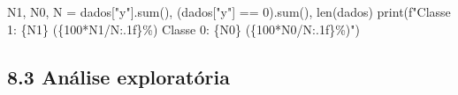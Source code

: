 \documentclass[
  letterpaper,
  DIV=11,
  numbers=noendperiod]{scrartcl}
\newenvironment{Shaded}{\begin{snugshade}}{\end{snugshade}}
\newcommand{\BuiltInTok}[1]{\textcolor[rgb]{0.00,0.23,0.31}{#1}}
\newcommand{\DecValTok}[1]{\textcolor[rgb]{0.68,0.00,0.00}{#1}}
\newcommand{\NormalTok}[1]{\textcolor[rgb]{0.00,0.23,0.31}{#1}}
\newcommand{\OperatorTok}[1]{\textcolor[rgb]{0.37,0.37,0.37}{#1}}
\newcommand{\SpecialCharTok}[1]{\textcolor[rgb]{0.37,0.37,0.37}{#1}}
\newcommand{\SpecialStringTok}[1]{\textcolor[rgb]{0.13,0.47,0.30}{#1}}
\newcommand{\StringTok}[1]{\textcolor[rgb]{0.13,0.47,0.30}{#1}}
\begin{document}
\begin{Shaded}
\begin{Highlighting}[]
\NormalTok{N1, N0, N }\OperatorTok{=}\NormalTok{ dados[}\StringTok{"y"}\NormalTok{].}\BuiltInTok{sum}\NormalTok{(), (dados[}\StringTok{"y"}\NormalTok{] }\OperatorTok{==} \DecValTok{0}\NormalTok{).}\BuiltInTok{sum}\NormalTok{(), }\BuiltInTok{len}\NormalTok{(dados)}
\BuiltInTok{print}\NormalTok{(}\SpecialStringTok{f"Classe 1: }\SpecialCharTok{\{}\NormalTok{N1}\SpecialCharTok{\}}\SpecialStringTok{ (}\SpecialCharTok{\{}\DecValTok{100}\OperatorTok{*}\NormalTok{N1}\OperatorTok{/}\NormalTok{N}\SpecialCharTok{:.1f\}}\SpecialStringTok{\%)   Classe 0: }\SpecialCharTok{\{}\NormalTok{N0}\SpecialCharTok{\}}\SpecialStringTok{ (}\SpecialCharTok{\{}\DecValTok{100}\OperatorTok{*}\NormalTok{N0}\OperatorTok{/}\NormalTok{N}\SpecialCharTok{:.1f\}}\SpecialStringTok{\%)"}\NormalTok{)}
\end{Highlighting}
\end{Shaded}

\subsection{8.3 Análise
exploratória}\label{anuxe1lise-exploratuxf3ria-1}
\end{document}
